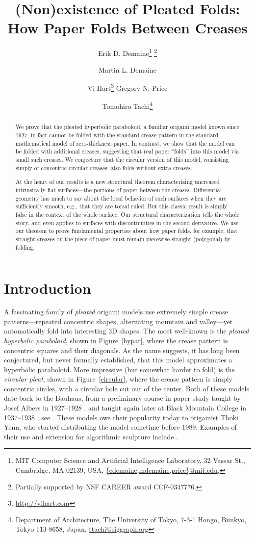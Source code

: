 \documentclass[11pt,letterpaper]{article}
\title{(Non)existence of Pleated Folds: \\
       How Paper Folds Between Creases}
\author{Erik D. Demaine\thanks{MIT Computer Science and Artificial Intelligence Laboratory,
      32 Vassar St., Cambridge, MA 02139, USA,
      \protect\url{{edemaine,mdemaine,price}@mit.edu}.}
    \thanks{Partially supported by NSF CAREER award CCF-0347776.}
\and
  Martin L. Demaine\footnotemark[1]
\and
  Vi Hart\thanks{\protect\url{http://vihart.com}}
\andlinebreak
  Gregory N. Price\footnotemark[1]
\and
  Tomohiro Tachi\thanks{Department of Architecture, The University of Tokyo,
      7-3-1 Hongo, Bunkyo, Tokyo 113-8658, Japan,
      \protect\url{ttachi@siggraph.org}}
}
\date{}
\begin{document}
\maketitle


\begin{abstract}
  We prove that the pleated hyperbolic paraboloid, a familiar origami
  model known since 1927, in fact cannot be folded with the standard crease
  pattern in the standard mathematical model of zero-thickness paper.
  In contrast, we show that the model can be folded with additional creases,
  suggesting that real paper ``folds'' into this model via small such creases.
  We conjecture that the circular version of this model, consisting simply
  of concentric circular creases, also folds without extra creases.

  At the heart of our results is a new structural theorem characterizing
  uncreased intrinsically flat surfaces---the portions of paper between
  the creases.  Differential geometry has much to say about the local
  behavior of such surfaces when they are sufficiently smooth, e.g.,
  that they are torsal ruled.  But this classic result is simply false
  in the context of the whole surface.  Our structural characterization
  tells the whole story, and even applies to surfaces with discontinuities
  in the second derivative.
  We use our theorem to prove fundamental properties about how paper folds,
  for example, that straight creases on the piece of paper
  must remain piecewise-straight (polygonal) by folding.
\end{abstract}



\section{Introduction}

A fascinating family of \emph{pleated} origami models use extremely simple
crease patterns---repeated concentric shapes, alternating mountain and
valley---yet automatically fold into interesting 3D shapes.
The most well-known is the \emph{pleated hyperbolic paraboloid},
shown in Figure~\ref{hypar}, where the crease pattern is concentric squares
and their diagonals.
As the name suggests, it has long been conjectured, but never formally
established, that this model approximates a hyperbolic paraboloid.
More impressive (but somewhat harder to fold) is the \emph{circular pleat},
shown in Figure~\ref{circular}, where the crease pattern is simply
concentric circles, with a circular hole cut out of the center.
Both of these models date back to the Bauhaus, from a preliminary course in
paper study taught by Josef Albers in 1927--1928 \cite[p.~434]{Wingler-1969},
and taught again later at Black Mountain College in 1937--1938
\cite[pp.~33, 73]{Adler-2004}; see \cite{curved}.
These models owe their popularity today to origamist Thoki Yenn,
who started distributing the model sometime before 1989.
Examples of their use and extension for algorithmic sculpture
include \cite{BRIDGES99,AAG08}.
\end{document}
